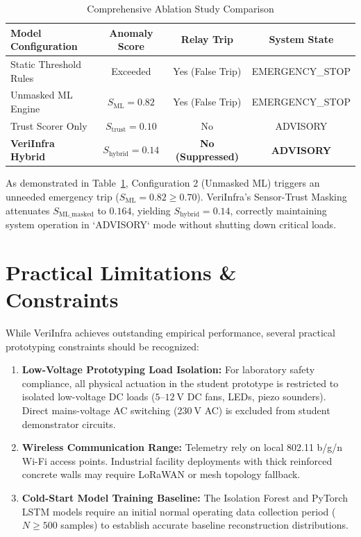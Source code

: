 \documentclass[conference]{IEEEtran}
\begin{document}
\begin{table}[htbp]
\caption{Comprehensive Ablation Study Comparison}
\label{tab:ablation_full}
\begin{center}
\begin{tabular}{|l|c|c|c|}
\hline
\textbf{Model Configuration} & \textbf{Anomaly Score} & \textbf{Relay Trip} & \textbf{System State} \\
\hline
Static Threshold Rules & Exceeded & Yes (False Trip) & EMERGENCY\_STOP \\
Unmasked ML Engine & $S_{\text{ML}} = 0.82$ & Yes (False Trip) & EMERGENCY\_STOP \\
Trust Scorer Only & $S_{\text{trust}} = 0.10$ & No & ADVISORY \\
\textbf{VeriInfra Hybrid} & $S_{\text{hybrid}} = 0.14$ & \textbf{No (Suppressed)} & \textbf{ADVISORY} \\
\hline
\end{tabular}
\end{center}
\end{table}

As demonstrated in Table~\ref{tab:ablation_full}, Configuration 2 (Unmasked ML) triggers an unneeded emergency trip ($S_{\text{ML}} = 0.82 \ge 0.70$). VeriInfra's Sensor-Trust Masking attenuates $S_{\text{ML\_masked}}$ to $0.164$, yielding $S_{\text{hybrid}} = 0.14$, correctly maintaining system operation in `ADVISORY` mode without shutting down critical loads.

\section{Practical Limitations \& Constraints}
\label{sec:limitations}
While VeriInfra achieves outstanding empirical performance, several practical prototyping constraints should be recognized:

\begin{enumerate}
    \item \textbf{Low-Voltage Prototyping Load Isolation:} For laboratory safety compliance, all physical actuation in the student prototype is restricted to isolated low-voltage DC loads ($5\text{--}12~\text{V}$ DC fans, LEDs, piezo sounders). Direct mains-voltage AC switching ($230~\text{V}$ AC) is excluded from student demonstrator circuits.
    \item \textbf{Wireless Communication Range:} Telemetry rely on local 802.11 b/g/n Wi-Fi access points. Industrial facility deployments with thick reinforced concrete walls may require LoRaWAN or mesh topology fallback.
    \item \textbf{Cold-Start Model Training Baseline:} The Isolation Forest and PyTorch LSTM models require an initial normal operating data collection period ($N \ge 500$ samples) to establish accurate baseline reconstruction distributions.
\end{enumerate}
\end{document}
